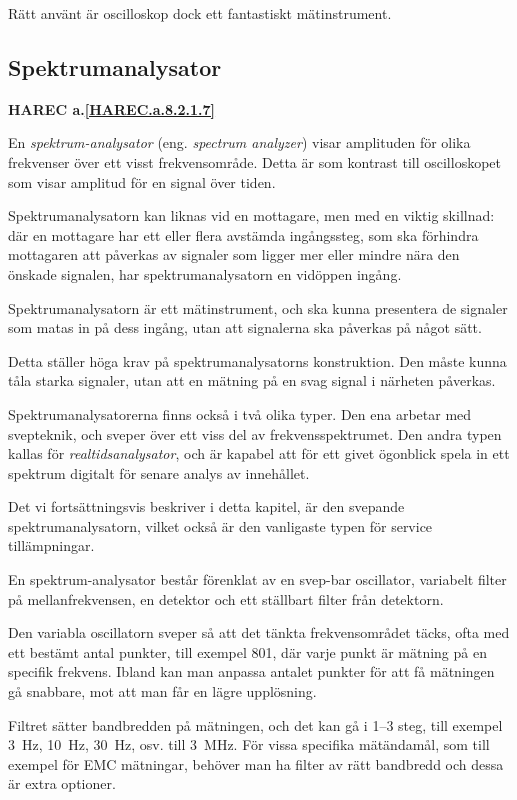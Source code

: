 Rätt använt är oscilloskop dock ett fantastiskt mätinstrument.

\subsection{Spektrumanalysator}
\textbf{
HAREC a.\ref{HAREC.a.8.2.1.7}\label{myHAREC.a.8.2.1.7}
}
\label{spektrumanalysator}

En \emph{spektrum-analysator} (eng. \emph{spectrum analyzer}) visar amplituden
för olika frekvenser över ett visst frekvensområde.
Detta är som kontrast till oscilloskopet som visar amplitud för en signal
över tiden.

Spektrumanalysatorn kan liknas vid en mottagare, men med en viktig skillnad:
där en mottagare har ett eller flera avstämda ingångssteg, som ska förhindra
mottagaren att påverkas av signaler som ligger mer eller mindre nära den
önskade signalen, har spektrumanalysatorn en vidöppen ingång.

Spektrumanalysatorn är ett mätinstrument, och ska kunna presentera de
signaler som matas in på dess ingång, utan att signalerna ska påverkas på
något sätt.

Detta ställer höga krav på spektrumanalysatorns konstruktion.
Den måste kunna tåla starka signaler, utan att en mätning på en svag signal i
närheten påverkas.

Spektrumanalysatorerna finns också i två olika typer.
Den ena arbetar med svepteknik, och sveper över ett viss del av
frekvensspektrumet.
Den andra typen kallas för \emph{realtidsanalysator}, och är kapabel att för
ett givet ögonblick spela in ett spektrum digitalt för senare analys av
innehållet.

Det vi fortsättningsvis beskriver i detta kapitel, är den svepande
spektrumanalysatorn, vilket också är den vanligaste typen för
service tillämpningar.

En spektrum-analysator består förenklat av en svep-bar oscillator,
variabelt filter på mellanfrekvensen, en detektor och ett ställbart
filter från detektorn.

Den variabla oscillatorn sveper så att det tänkta frekvensområdet täcks,
ofta med ett bestämt antal punkter, till exempel 801, där varje punkt är mätning på
en specifik frekvens.
Ibland kan man anpassa antalet punkter för att få mätningen gå snabbare,
mot att man får en lägre upplösning.

Filtret sätter bandbredden på mätningen, och det kan gå i 1--3 steg, till exempel
3~Hz, 10~Hz, 30~Hz, osv. till 3~MHz.
För vissa specifika mätändamål, som till exempel för EMC mätningar, behöver man ha
filter av rätt bandbredd och dessa är extra optioner.

